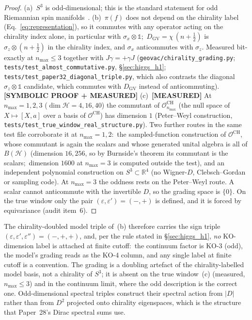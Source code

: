 \documentclass[11pt]{article}
\begin{document}
\begin{proof}
(a)~$S^3$ is odd-dimensional; this is the standard statement for odd
Riemannian spin manifolds~\cite{connes1995}.
(b)~$\pi(f)$ does not depend on the chirality label
(Eq.~\eqref{eq:representation}), so it commutes with any operator
acting on the chirality index alone, in particular with $\sigma_x
\otimes \mathbb{1}$;\ $D_{\mathrm{GV}} = \chi\,(n + \tfrac12)$ is
$\sigma_z \otimes (n + \tfrac12)$ in the chirality index, and
$\sigma_x$ anticommutes with $\sigma_z$.  Measured bit-exactly at
$n_{\max} \le 3$ together with $J\gamma = +\gamma J$
(\texttt{geovac/chirality\_grading.py};
\texttt{tests/test\_almost\_commutative.py},
\S\ref{sec:higgs_h1}; \texttt{tests/test\_paper32\_diagonal\_triple.py},
which also contrasts the diagonal $\sigma_z \otimes \mathbb{1}$
candidate, which commutes with $D_{\mathrm{GV}}$ instead of
anticommuting).  \textbf{[SYMBOLIC PROOF + MEASURED]}
(c)~\textbf{[MEASURED]} At $n_{\max} = 1, 2, 3$
($\dim \mathcal{H} = 4, 16, 40$) the commutant of
$\mathcal{O}^{\mathrm{CH}}_{n_{\max}}$ (the null space of
$X \mapsto [X, a]$ over a basis of $\mathcal{O}^{\mathrm{CH}}$) has
dimension $1$ (Peter--Weyl construction,
\texttt{tests/test\_true\_window\_real\_structure.py}).  Two further
routes in the same test file corroborate it at $n_{\max} = 1, 2$:\ the
sampled-function construction of $\mathcal{O}^{\mathrm{CH}}$, whose
commutant is again the scalars and whose generated unital algebra is
all of $B(\mathcal{H})$ (dimension $16, 256$, so by Burnside's theorem
its commutant is the scalars;\ dimension $1600$ at $n_{\max} = 3$ is
computed outside the test), and an independent polynomial construction
on $S^3 \subset \mathbb{R}^4$ (no Wigner-$D$, Clebsch--Gordan or
sampling code).  At $n_{\max} = 3$ the oddness rests on the Peter--Weyl
route.  A scalar cannot anticommute with
the invertible $D$, so the grading space is $\{0\}$.  On the true
window only the pair $(\varepsilon, \varepsilon') = (-,+)$ is defined,
and it is forced by equivariance (audit item~6).
\end{proof}

The chirality-doubled model triple of~(b) therefore carries the sign
triple $(\varepsilon, \varepsilon', \varepsilon'') = (-, +, +)$, and,
per the rule stated in \S\ref{sec:higgs_h1}, \emph{no} KO-dimension
label is attached at finite cutoff:\ the continuum factor is KO-3
(odd), the model's grading reads as the KO-4 column, and any single
label at finite cutoff is a convention.  The grading is a doubling
artefact of the chirality-labelled model basis, not a chirality of
$S^3$; it is absent on the true window~(c) (measured, $n_{\max} \le 3$) and in the continuum limit,
where the odd description is the correct one.  Odd-dimensional spectral triples construct their
spectral action from $|D|$ rather than from $D^2$ projected onto
chirality eigenspaces, which is the structure that Paper~28's
Dirac spectral sums use.
\end{document}
